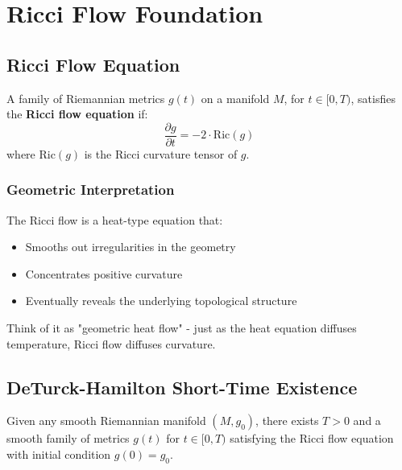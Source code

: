 \chapter{Ricci Flow Foundation}
\label{chap:ricci_flow_foundation}

\section{Ricci Flow Equation}

\begin{definition}
\leanok
A family of Riemannian metrics $g(t)$ on a manifold $M$, for $t \in [0,T)$, satisfies the \textbf{Ricci flow equation} if:
\[
\frac{\partial g}{\partial t} = -2 \cdot \text{Ric}(g)
\]
where $\text{Ric}(g)$ is the Ricci curvature tensor of $g$.
\end{definition}

\subsection{Geometric Interpretation}

The Ricci flow is a heat-type equation that:
\begin{itemize}
\item Smooths out irregularities in the geometry
\item Concentrates positive curvature
\item Eventually reveals the underlying topological structure
\end{itemize}

Think of it as "geometric heat flow" - just as the heat equation diffuses temperature, Ricci flow diffuses curvature.

\section{DeTurck-Hamilton Short-Time Existence}

\begin{theorem}
\label{thm:deturck_existence}
\leanok
Given any smooth Riemannian manifold $(M, g_0)$, there exists $T > 0$ and a smooth family of metrics $g(t)$ for $t \in [0, T)$ satisfying the Ricci flow equation with initial condition $g(0) = g_0$.
\end{theorem}


